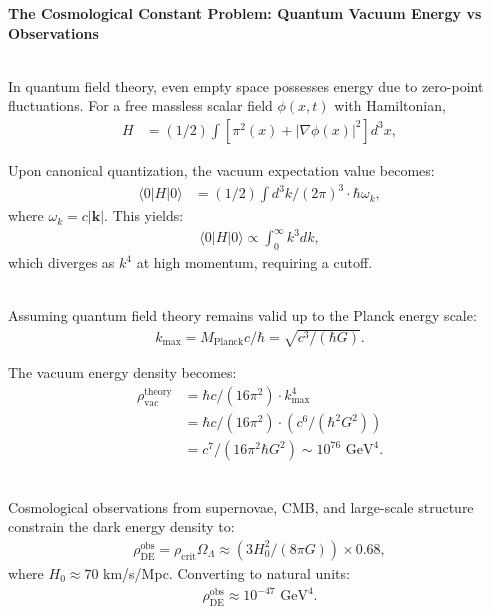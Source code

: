 \begin{technical}
{\Large\textbf{The Cosmological Constant Problem: Quantum Vacuum Energy vs Observations}}


\medskip

\\
In quantum field theory, even empty space possesses energy due to zero-point fluctuations. For a free massless scalar field $\phi(x,t)$ with Hamiltonian,
\begin{align*}
H &= (1/2) \int \left[ \pi^2(x) + |\nabla \phi(x)|^2 \right] d^3x,
\end{align*}

Upon canonical quantization, the vacuum expectation value becomes:
\begin{align*}
\langle 0 | H | 0 \rangle &= (1/2) \int d^3k/(2\pi)^3 \cdot \hbar\omega_k,
\end{align*}
where $\omega_k = c|\mathbf{k}|$. This yields:
\begin{align*}
\langle 0 | H | 0 \rangle \propto \int_0^\infty k^3 dk,
\end{align*}
which diverges as $k^4$ at high momentum, requiring a cutoff.

\medskip

\\
Assuming quantum field theory remains valid up to the Planck energy scale:
\begin{align*}
k_{\max} = M_{\text{Planck}} c/\hbar = \sqrt{c^3/(\hbar G)}.
\end{align*}

The vacuum energy density becomes:
\begin{align*}
\rho_{\text{vac}}^{\text{theory}} &= \hbar c/(16\pi^2) \cdot k_{\max}^4 \\
&= \hbar c/(16\pi^2) \cdot (c^6/(\hbar^2 G^2)) \\
&= c^7/(16\pi^2 \hbar G^2) \sim 10^{76} \text{ GeV}^4.
\end{align*}

\medskip

\\
Cosmological observations from supernovae, CMB, and large-scale structure constrain the dark energy density to:
\begin{align*}
\rho_{\text{DE}}^{\text{obs}} = \rho_{\text{crit}} \Omega_\Lambda \approx (3H_0^2/(8\pi G)) \times 0.68,
\end{align*}
where $H_0 \approx 70$ km/s/Mpc. Converting to natural units:
\begin{align*}
\rho_{\text{DE}}^{\text{obs}} \approx 10^{-47} \text{ GeV}^4.
\end{align*}


\end{technical}

